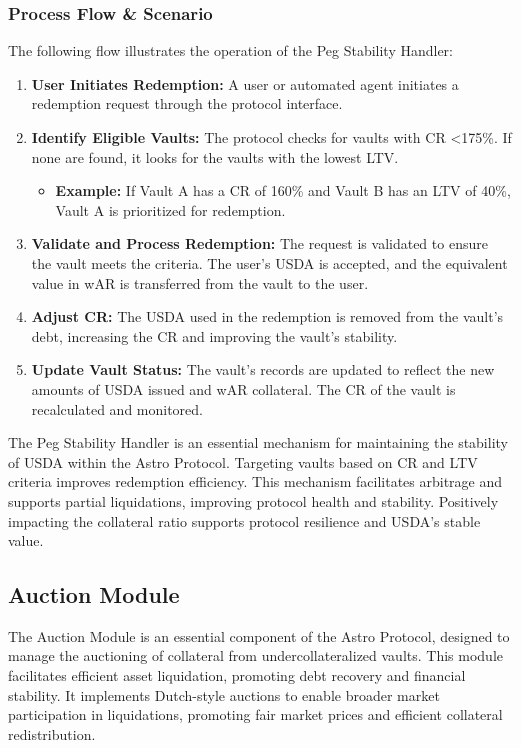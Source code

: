 \subsubsection{Process Flow \& Scenario}
The following flow illustrates the operation of the Peg Stability Handler:
\begin{enumerate}
    \item \textbf{User Initiates Redemption:} A user or automated agent initiates a redemption request through the protocol interface.
    \item \textbf{Identify Eligible Vaults:} The protocol checks for vaults with CR \textless  175\%. If none are found, it looks for the vaults with the lowest LTV.
    \begin{itemize}
        \item \textbf{Example:} If Vault A has a CR of 160\% and Vault B has an LTV of 40\%, Vault A is prioritized for redemption.
    \end{itemize}
    \item \textbf{Validate and Process Redemption:} The request is validated to ensure the vault meets the criteria. The user’s USDA is accepted, and the equivalent value in wAR is transferred from the vault to the user.
    \item \textbf{Adjust CR:} The USDA used in the redemption is removed from the vault’s debt, increasing the CR and improving the vault’s stability.
    \item \textbf{Update Vault Status:} The vault’s records are updated to reflect the new amounts of USDA issued and wAR collateral. The CR of the vault is recalculated and monitored.
\end{enumerate}

The Peg Stability Handler is an essential mechanism for maintaining the stability of USDA within the Astro Protocol. Targeting vaults based on CR and LTV criteria improves redemption efficiency. This mechanism facilitates arbitrage and supports partial liquidations, improving protocol health and stability. Positively impacting the collateral ratio supports protocol resilience and USDA's stable value.


\subsection{Auction Module}
The Auction Module is an essential component of the Astro Protocol, designed to manage the auctioning of collateral from undercollateralized vaults. This module facilitates efficient asset liquidation, promoting debt recovery and financial stability. It implements Dutch-style auctions to enable broader market participation in liquidations, promoting fair market prices and efficient collateral redistribution.

